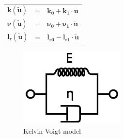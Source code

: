 \documentclass[pdftex,a4paper,11pt]{report}
\newcommand{\vs}[1]{\boldsymbol{#1}} %
\numberwithin{equation}{subsection}
\begin{document}
\paragraph{}
\begin{tabular}{lcl}
    $\vs{k}  (\vs{\tilde{u}})$  & = &  $\vs{k_0}    + \vs{k_1}    \cdot \vs{\tilde{u}}$ \\
    $\vs{\nu}(\vs{\tilde{u}})$  & = &  $\vs{\nu_0}  + \vs{\nu_1}  \cdot \vs{\tilde{u}}$ \\
    $\vs{l_r}(\vs{\tilde{u}})$  & = &  $\vs{l_{r0}} - \vs{l_{r1}} \cdot \vs{\tilde{u}}$ \\
\end{tabular}

\begin{figure}[h]
    \centering
    \includegraphics[width=.20\linewidth]{fig/Kelvin_Voigt_diagram}
    \caption{Kelvin-Voigt model}
\end{figure}
\end{document}
